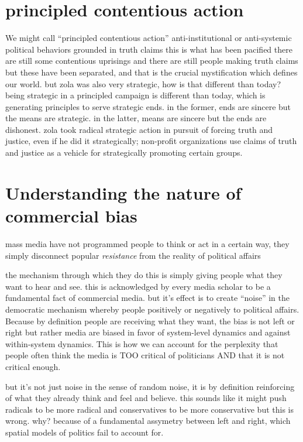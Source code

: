 \documentclass[12pt,book]{article}
\begin{document}
\section{principled contentious
action}\label{principled-contentious-action}

We might call ``principled contentious action'' anti-institutional or
anti-systemic political behaviors grounded in truth claims this is what
has been pacified there are still some contentious uprisings and there
are still people making truth claims but these have been separated, and
that is the crucial mystification which defines our world. but zola was
also very strategic, how is that different than today? being strategic
in a principled campaign is different than today, which is generating
principles to serve strategic ends. in the former, ends are sincere but
the means are strategic. in the latter, means are sincere but the ends
are dishonest. zola took radical strategic action in pursuit of forcing
truth and justice, even if he did it strategically; non-profit
organizations use claims of truth and justice as a vehicle for
strategically promoting certain groups.

\section{Understanding the nature of commercial
bias}\label{understanding-the-nature-of-commercial-bias}

mass media have not programmed people to think or act in a certain way,
they simply disconnect popular \emph{resistance} from the reality of
political affairs

the mechanism through which they do this is simply giving people what
they want to hear and see. this is acknowledged by every media scholar
to be a fundamental fact of commercial media. but it's effect is to
create ``noise'' in the democratic mechanism whereby people positively
or negatively to political affairs. Because by definition people are
receiving what they want, the bias is not left or right but rather media
are biased in favor of system-level dynamics and against within-system
dynamics. This is how we can account for the perplexity that people
often think the media is TOO critical of politicians AND that it is not
critical enough.

but it's not just noise in the sense of random noise, it is by
definition reinforcing of what they already think and feel and believe.
this sounds like it might push radicals to be more radical and
conservatives to be more conservative but this is wrong. why? because of
a fundamental assymetry between left and right, which spatial models of
politics fail to account for.
\end{document}
